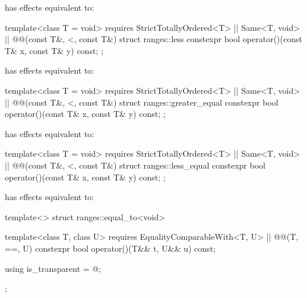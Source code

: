 \begin{itemdescr}
\pnum
{} has effects equivalent to:
\end{itemdescr}

%
\begin{itemdecl}
template<class T = void>
  requires StrictTotallyOrdered<T> || Same<T, void> || @@(const T&, <, const T&)
struct ranges::less {
  constexpr bool operator()(const T& x, const T& y) const;
};
\end{itemdecl}

\begin{itemdescr}
\pnum
{} has effects equivalent to:
\end{itemdescr}

%
\begin{itemdecl}
template<class T = void>
  requires StrictTotallyOrdered<T> || Same<T, void> || @@(const T&, <, const T&)
struct ranges::greater_equal {
  constexpr bool operator()(const T& x, const T& y) const;
};
\end{itemdecl}

\begin{itemdescr}
\pnum
{} has effects equivalent to:
\end{itemdescr}

%
\begin{itemdecl}
template<class T = void>
  requires StrictTotallyOrdered<T> || Same<T, void> || @@(const T&, <, const T&)
struct ranges::less_equal {
  constexpr bool operator()(const T& x, const T& y) const;
};
\end{itemdecl}

\begin{itemdescr}
\pnum
{} has effects equivalent to:
\end{itemdescr}

%
\begin{itemdecl}
template<> struct ranges::equal_to<void> {
  template<class T, class U>
    requires EqualityComparableWith<T, U> || @@(T, ==, U)
  constexpr bool operator()(T&& t, U&& u) const;

  using is_transparent = @\unspecnc@;
};
\end{itemdecl}

